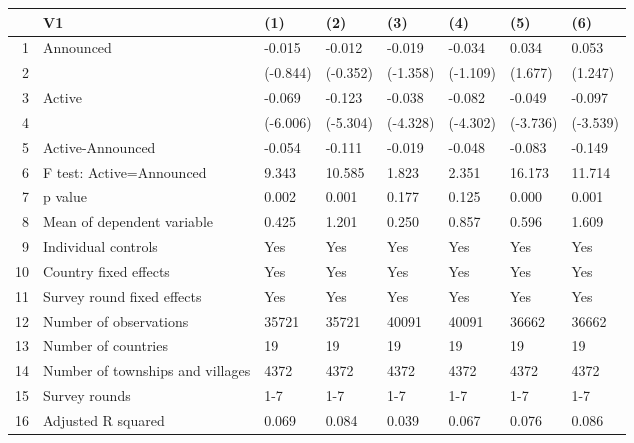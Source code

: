 \begin{table}[ht]
\centering
\begin{tabular}{rlllllll}
  \hline
 & V1 & (1) & (2) & (3) & (4) & (5) & (6) \\ 
  \hline
1 & Announced & -0.015 & -0.012 & -0.019 & -0.034 & 0.034 & 0.053 \\ 
  2 &  & (-0.844) & (-0.352) & (-1.358) & (-1.109) & (1.677) & (1.247) \\ 
  3 & Active & -0.069 & -0.123 & -0.038 & -0.082 & -0.049 & -0.097 \\ 
  4 &  & (-6.006) & (-5.304) & (-4.328) & (-4.302) & (-3.736) & (-3.539) \\ 
  5 & Active-Announced & -0.054 & -0.111 & -0.019 & -0.048 & -0.083 & -0.149 \\ 
  6 & F test: Active=Announced & 9.343 & 10.585 & 1.823 & 2.351 & 16.173 & 11.714 \\ 
  7 & p value & 0.002 & 0.001 & 0.177 & 0.125 & 0.000 & 0.001 \\ 
  8 & Mean of dependent variable & 0.425 & 1.201 & 0.250 & 0.857 & 0.596 & 1.609 \\ 
  9 & Individual controls & Yes & Yes & Yes & Yes & Yes & Yes \\ 
  10 & Country fixed effects & Yes & Yes & Yes & Yes & Yes & Yes \\ 
  11 & Survey round fixed effects & Yes & Yes & Yes & Yes & Yes & Yes \\ 
  12 & Number of observations & 35721 & 35721 & 40091 & 40091 & 36662 & 36662 \\ 
  13 & Number of countries & 19 & 19 & 19 & 19 & 19 & 19 \\ 
  14 & Number of townships and villages & 4372 & 4372 & 4372 & 4372 & 4372 & 4372 \\ 
  15 & Survey rounds & 1-7 & 1-7 & 1-7 & 1-7 & 1-7 & 1-7 \\ 
  16 & Adjusted R squared & 0.069 & 0.084 & 0.039 & 0.067 & 0.076 & 0.086 \\ 
   \hline
\end{tabular}
\end{table}
